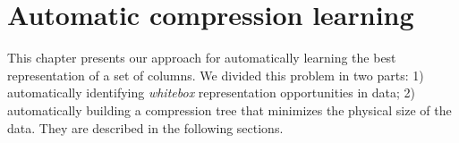 
\chapter{Automatic compression learning}
\label{ch:automaticlearning}





% 

This chapter presents our approach for automatically learning the best representation of a set of columns. We divided this problem in two parts: 1) automatically identifying \textit{whitebox} representation opportunities in data; 2) automatically building a compression tree that minimizes the physical size of the data. They are described in the following sections.







